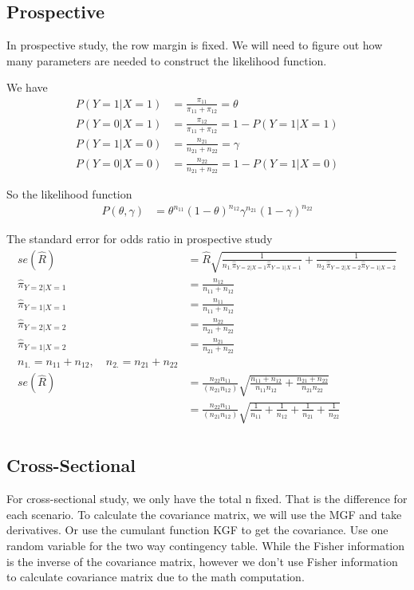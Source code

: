 \subsection{Prospective}
In prospective study, the row margin is fixed. We will need to figure out how many parameters are needed to construct the likelihood function.

We have
	\begin{align*}
	P(Y=1|X=1) &= \frac{\pi_{11}}{\pi_{11} + \pi_{12}} = \theta\\
	P(Y=0|X=1) &= \frac{\pi_{12}}{\pi_{11} + \pi_{12}} = 1 - P(Y=1|X=1)\\
	P(Y=1|X=  0) &= \frac{n_{21}}{n_{21}+ n_{22}} = \gamma \\
	P(Y= 0|X=  0) &=  \frac{n_{22}}{n_{21}+ n_{22}} = 1 - P(Y=1|X=  0)
\end{align*}

So the likelihood function
\begin{align*}
	P(\theta, \gamma) &= \theta^{n_{11}} (1-\theta)^{n_{12}} \gamma^{n_{21}} (1-\gamma)^{n_{22}}
\end{align*}

The standard error for odds ratio in prospective study
	\begin{align*}
		se(\hat R) &= \hat{R} \sqrt{\frac{1}{n_{1.}\hat{\pi}_{Y=2|X=1}\hat{\pi}_{Y=1|X=1} } + \frac{1}{n_{2.}\hat{\pi}_{Y=2|X=2} \hat {\pi}_{Y=1|X=2} } }\\
		\hat{\pi}_{Y=2|X=1} &= \frac{n_{12}}{n_{11}+ n_{12}}\\
		\hat{\pi}_{Y=1|X=1} &= \frac{n_{11}}{n_{11}+ n_{12}}\\
		\hat{\pi}_{Y=2|X=2} &=  \frac{n_{22}}{n_{21} + n_{22}}\\
		\hat {\pi}_{Y=1|X=2} &= \frac{n_{21}}{n_{21} + n_{22}}\\
		n_{1.} = n_{11}+ n_{12}, \quad n_{2.}=n_{21} + n_{22}\\
		se(\hat R) &= \frac{n_{22}n_{11}}{(n_{21}n_{12})} \sqrt{\frac{n_{11}+n_{12}}{n_{11}n_{12}} + \frac{n_{21}+n_{22}}{n_{21}n_{22}} }\\
		&= \frac{{n_{22}n_{11}}}{(n_{21}n_{12})} \sqrt{\frac{1}{n_{11}} + \frac{1}{n_{12}} + \frac{1}{n_{21}} + \frac{1}{n_{22}}}\\
	\end{align*}
	
	\subsection{Cross-Sectional}
	For cross-sectional study, we only have the total n fixed. That is the difference for each scenario. 
	To calculate the covariance matrix, we will use the MGF and take derivatives. Or use the cumulant function KGF to get the covariance.
	Use one random variable for the two way contingency table. While the Fisher information is the inverse of the covariance matrix, however we don't use Fisher information to calculate covariance matrix due to the math computation.\\
	
